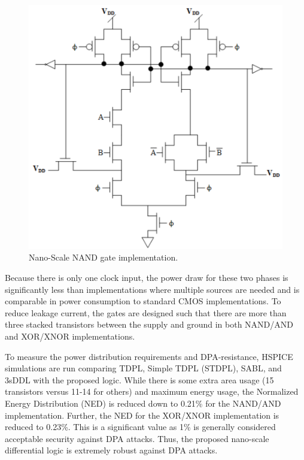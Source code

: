 \documentclass[conference, 12pt]{IEEEtran}
\newcommand{\x}{1}						%
\begin{document}
			\begin{figure}[tbp]
				\centering
				\includegraphics[width=\x\linewidth]{ReportFiles/Nano_NAND.png}
				\caption{Nano-Scale NAND gate implementation.\cite{b6}}
				\label{Nano_NAND}
			\end{figure}

			Because there is only one clock input, the power draw for these two phases is significantly less than implementations where multiple sources are needed and is comparable in power consumption to standard CMOS implementations. To reduce leakage current, the gates are designed such that there are more than three stacked transistors between the supply and ground in both NAND/AND and XOR/XNOR implementations. 

			To measure the power distribution requirements and DPA-resistance, HSPICE simulations are run comparing TDPL, Simple TDPL (STDPL), SABL, and 3sDDL with the proposed logic. While there is some extra area usage (15 transistors versus 11-14 for others) and maximum energy usage, the Normalized Energy Distribution (NED) is reduced down to 0.21\% for the NAND/AND implementation. Further, the NED for the XOR/XNOR implementation is reduced to 0.23\%. This is a significant value as 1\% is generally considered acceptable security against DPA attacks. Thus, the proposed nano-scale differential logic is extremely robust against DPA attacks. 
\end{document}
